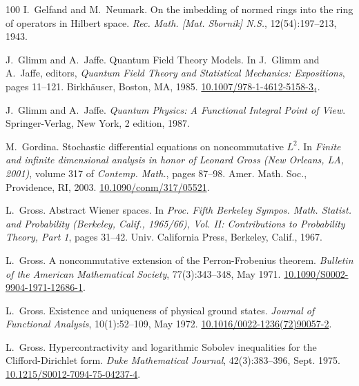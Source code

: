 \documentclass[11pt]{article}
\newcommand{\tmrsub}[1]{\ensuremath{_{\textrm{#1}}}}
\newcommand{\tmtextit}[1]{{\itshape{#1}}}
\begin{document}
\begin{thebibliography}{100}
  I.~Gelfand and M.~Neumark. {\newblock}On the imbedding
  of normed rings into the ring of operators in Hilbert space.
  {\newblock}\tmtextit{Rec. Math. [Mat. Sbornik] N.S.}, 12(54):197--213, 1943.
  
  J.~Glimm and A.~Jaffe. {\newblock}Quantum
  Field Theory Models. {\newblock}In J.~Glimm and A.~Jaffe, editors,
  \tmtextit{Quantum Field Theory and Statistical Mechanics: Expositions},
  pages 11--121. Birkh{\"a}user, Boston, MA, 1985. {\newblock}
  \href{https://doi.org/10.1007/978-1-4612-5158-3_4}{10.1007/978-1-4612-5158-3\tmrsub{4}}.
  
  J.~Glimm and A.~Jaffe.
  {\newblock}\tmtextit{Quantum Physics: A Functional Integral Point of View}.
  {\newblock}Springer-Verlag, New York, 2 edition, 1987.
  
  M.~Gordina. {\newblock}Stochastic differential
  equations on noncommutative $L^2$. {\newblock}In \tmtextit{Finite and
  infinite dimensional analysis in honor of Leonard Gross (New Orleans, LA,
  2001)}, volume 317 of \tmtextit{Contemp. Math.}, pages 87--98. Amer. Math.
  Soc., Providence, RI, 2003. {\newblock}
  \href{https://doi.org/10.1090/conm/317/05521}{10.1090/conm/317/05521}.
  
  L.~Gross. {\newblock}Abstract Wiener spaces.
  {\newblock}In \tmtextit{Proc. Fifth Berkeley Sympos. Math. Statist. and
  Probability (Berkeley, Calif., 1965/66), Vol. II: Contributions to
  Probability Theory, Part 1}, pages 31--42. Univ. California Press, Berkeley,
  Calif., 1967.
  
  L.~Gross. {\newblock}A noncommutative
  extension of the Perron-Frobenius theorem. {\newblock}\tmtextit{Bulletin of
  the American Mathematical Society}, 77(3):343--348, May 1971. {\newblock}
  \href{https://doi.org/10.1090/S0002-9904-1971-12686-1}{10.1090/S0002-9904-1971-12686-1}.
  
  L.~Gross. {\newblock}Existence and
  uniqueness of physical ground states. {\newblock}\tmtextit{Journal of
  Functional Analysis}, 10(1):52--109, May 1972. {\newblock}
  \href{https://doi.org/10.1016/0022-1236(72)90057-2}{10.1016/0022-1236(72)90057-2}.
  
  L.~Gross.
  {\newblock}Hypercontractivity and logarithmic Sobolev inequalities for the
  Clifford-Dirichlet form. {\newblock}\tmtextit{Duke Mathematical Journal},
  42(3):383--396, Sept. 1975. {\newblock}
  \href{https://doi.org/10.1215/S0012-7094-75-04237-4}{10.1215/S0012-7094-75-04237-4}.
  

\end{thebibliography}
\end{document}
